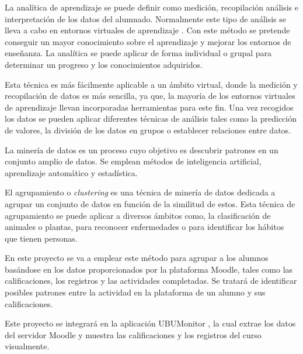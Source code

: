 La analítica de aprendizaje \cite{Analiticas_aprendizaje} se puede definir como medición, recopilación análisis e interpretación de los datos del alumnado. Normalmente este tipo de análisis se lleva a cabo en entornos virtuales de aprendizaje \cite{EVA}. Con este método se pretende conseguir un mayor conocimiento sobre el aprendizaje y mejorar los entornos de enseñanza. La analítica se puede aplicar de forma individual o grupal para determinar un progreso y los conocimientos adquiridos.

Esta técnica es más fácilmente aplicable a un ámbito virtual, donde la medición y recopilación de datos es más sencilla, ya que, la mayoría de los entornos virtuales de aprendizaje llevan incorporadas herramientas para este fin. Una vez recogidos los datos se pueden aplicar diferentes técnicas de análisis tales como la predicción de valores, la división de los datos en grupos o establecer relaciones entre datos.

La minería de datos es un proceso cuyo objetivo es descubrir patrones en un conjunto amplio de datos. Se emplean métodos de inteligencia artificial, aprendizaje automático y estadística.

El agrupamiento o \emph{clustering} es una técnica de minería de datos dedicada a agrupar un conjunto de datos en función de la similitud de estos. Esta técnica de agrupamiento se puede aplicar a diversos ámbitos como, la clasificación de animales o plantas, para reconocer enfermedades o para identificar los hábitos que tienen personas.

En este proyecto se va a emplear este método para agrupar a los alumnos basándose en los datos proporcionados por la plataforma Moodle, tales como las calificaciones, los registros y las actividades completadas. Se tratará de identificar posibles patrones entre la actividad en la plataforma de un alumno y sus calificaciones.

Este proyecto se integrará en la aplicación UBUMonitor \cite{yjx00032020Feb}, la cual extrae los datos del servidor Moodle y muestra las calificaciones y los registros del curso visualmente.
